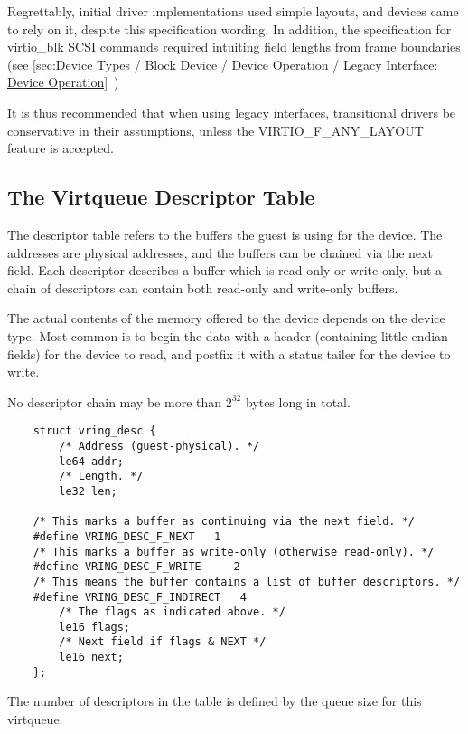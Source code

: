 Regrettably, initial driver implementations used simple layouts, and
devices came to rely on it, despite this specification wording.  In
addition, the specification for virtio_blk SCSI commands required
intuiting field lengths from frame boundaries (see
 \ref{sec:Device Types / Block Device / Device Operation / Legacy Interface: Device Operation}~)

It is thus recommended that when using legacy interfaces, transitional
drivers be conservative in their assumptions, unless the
VIRTIO_F_ANY_LAYOUT feature is accepted.

\subsection{The Virtqueue Descriptor Table}\label{sec:Basic Facilities of a Virtio Device / Virtqueues / The Virtqueue Descriptor Table}

The descriptor table refers to the buffers the guest is using for
the device. The addresses are physical addresses, and the buffers
can be chained via the next field. Each descriptor describes a
buffer which is read-only or write-only, but a chain of
descriptors can contain both read-only and write-only buffers.

The actual contents of the memory offered to the device depends on the
device type.  Most common is to begin the data with a header
(containing little-endian fields) for the device to read, and postfix
it with a status tailer for the device to write.

No descriptor chain may be more than $2^{32}$ bytes long in total.

\begin{lstlisting}
	struct vring_desc {
		/* Address (guest-physical). */
		le64 addr;
		/* Length. */
		le32 len;

	/* This marks a buffer as continuing via the next field. */
	#define VRING_DESC_F_NEXT   1
	/* This marks a buffer as write-only (otherwise read-only). */
	#define VRING_DESC_F_WRITE     2
	/* This means the buffer contains a list of buffer descriptors. */
	#define VRING_DESC_F_INDIRECT   4
		/* The flags as indicated above. */
		le16 flags;
		/* Next field if flags & NEXT */
		le16 next;
	};
\end{lstlisting}

The number of descriptors in the table is defined by the queue size
for this virtqueue.

